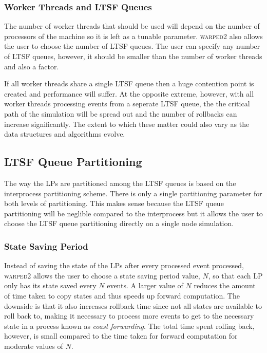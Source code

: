 \documentclass[11pt]{book}
\begin{document}
\subsubsection{Worker Threads and LTSF Queues}

The number of worker threads that should be used will depend on the number of processors of the
machine so it is left as a tunable parameter. \textsc{warped2} also allows the user to choose
the number of LTSF queues. The user can specify any number of LTSF queues, however, it should
be smaller than the number of worker threads and also a factor. 

If all worker threads share a single LTSF queue then a huge contention point is created and
performance will suffer. At the opposite extreme, however, with all worker threads processing
events from a seperate LTSF queue, the the critical path of the simulation will be spread out
and the number of rollbacks can increase significantly. The extent to which these matter could
also vary as the data structures and algorithms evolve.

\subsection{LTSF Queue Partitioning}

The way the LPs are partitioned among the LTSF queues is based on the interprocess partitioning
scheme. There is only a single partitioning parameter for both levels of partitioning. This makes
sense because the LTSF queue partitioning will be neglible compared to the interprocess but
it allows the user to choose the LTSF queue partitioning directly on a single node
simulation. 

\subsubsection{State Saving Period}

Instead of saving the state of the LPs after every processed event processed, \textsc{warped2}
allows the user to choose a state saving period value, $N$, so that each LP only has its state
saved every $N$ events. A larger value of $N$ reduces the amount of time taken to copy states
and thus speeds up forward computation. The downside is that it also increases rollback time
since not all states are available to roll back to, making it necessary to process more events to
get to the necessary state in a process known as \emph{coast forwarding}. The total time spent
rolling back, however, is small compared to the time taken for forward computation for moderate
values of $N$.
\end{document}

